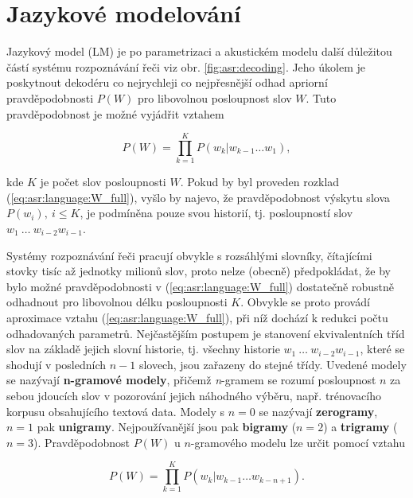 \section{Jazykové modelování}
\label{chap:asr:language}

Jazykový model (LM) je po parametrizaci a akustickém modelu další důležitou částí systému rozpoznávání řeči viz obr. \ref{fig:asr:decoding}. Jeho úkolem je poskytnout dekodéru co nejrychleji co nejpřesnější odhad apriorní pravděpodobnosti $P\left(W\right)$ pro libovolnou posloupnost slov $W$. Tuto pravděpodobnost je možné vyjádřit vztahem

\begin{equation}
  P\left(W\right) = \prod_{k=1}^{K} P\left(w_k | w_{k-1}\dots w_{1}\right),
  \label{eq:asr:language:W_full}
\end{equation}

\noindent kde $K$ je počet slov posloupnosti $W$. Pokud by byl proveden rozklad (\ref{eq:asr:language:W_full}), vyšlo by najevo, že pravděpodobnost výskytu slova $P\left(w_i\right),\ i \leq K$, je podmíněna pouze svou historií, tj. posloupností slov $w_1\ \dots\ w_{i-2}w_{i-1}$.

Systémy rozpoznávání řeči pracují obvykle s rozsáhlými slovníky, čítajícími stovky tisíc až jednotky milionů slov, proto nelze (obecně) předpokládat, že by bylo možné pravděpodobnosti v (\ref{eq:asr:language:W_full}) dostatečně robustně odhadnout pro libovolnou délku posloupnosti $K$.
Obvykle se proto provádí aproximace vztahu (\ref{eq:asr:language:W_full}), při níž dochází k redukci počtu odhadovaných parametrů. Nejčastějším postupem je stanovení ekvivalentních tříd slov na základě jejich slovní historie, tj. všechny historie $w_1\ \dots\ w_{i-2}w_{i-1}$, které se shodují v posledních $n-1$ slovech, jsou zařazeny do stejné třídy. Uvedené modely se nazývají \textbf{n-gramové modely}, přičemž \textit{n}-gramem se rozumí posloupnost $n$ za sebou jdoucích slov v pozorování jejich náhodného výběru, např. trénovacího korpusu obsahujícího textová data. Modely s $n=0$ se nazývají \textbf{zerogramy}, $n=1$ pak \textbf{unigramy}. Nejpoužívanější jsou pak \textbf{bigramy} ($n=2$) a \textbf{trigramy} ($n=3$). Pravděpodobnost $P\left(W\right)$ u $n$-gramového modelu lze určit pomocí vztahu

\begin{equation}
  P\left(W\right) = \prod_{k=1}^{K} P\left(w_k | w_{k-1}\dots w_{k-n+1}\right).
  \label{eq:asr:language:W}
\end{equation}


